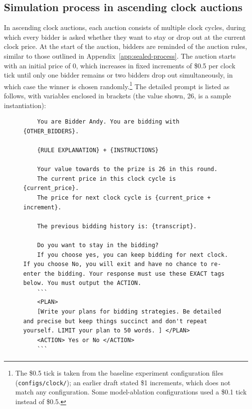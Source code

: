 \subsection{Simulation process in ascending clock auctions}\label{app:clock-process}

In ascending clock auctions, each auction consists of multiple clock cycles, during which every bidder is asked whether they want to stay or drop out at the current clock price.
At the start of the auction, bidders are reminded of the auction rules, similar to those outlined in Appendix~\ref{app:sealed-process}.
The auction starts with an initial price of 0, which increases in fixed increments of \$0.5 per clock tick until only one bidder remains or two bidders drop out simultaneously, in which case the winner is chosen randomly.\footnote{The \$0.5 tick is taken from the baseline experiment configuration files (\texttt{configs/clock/}); an earlier draft stated \$1 increments, which does not match any configuration. Some model-ablation configurations used a \$0.1 tick instead of \$0.5. }
The detailed prompt is listed as follows, with variables enclosed in brackets (the value shown, 26, is a sample instantiation):

\begin{figure}[H]
\centering
\begin{minipage}{0.95\textwidth}
\begin{lstlisting}
    You are Bidder Andy. You are bidding with {OTHER_BIDDERS}.

    {RULE EXPLANATION} + {INSTRUCTIONS}

    Your value towards to the prize is 26 in this round.
    The current price in this clock cycle is {current_price}.
    The price for next clock cycle is {current_price + increment}.

    The previous bidding history is: {transcript}.

    Do you want to stay in the bidding?
    If you choose yes, you can keep bidding for next clock. If you choose No, you will exit and have no chance to re-enter the bidding. Your response must use these EXACT tags below. You must output the ACTION.
    ```
    <PLAN>
    [Write your plans for bidding strategies. Be detailed and precise but keep things succinct and don't repeat yourself. LIMIT your plan to 50 words. ] </PLAN>
    <ACTION> Yes or No </ACTION>
    ```
\end{lstlisting}
\end{minipage}
\end{figure}

